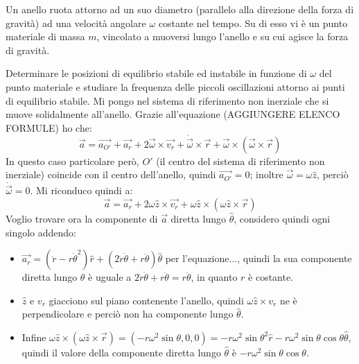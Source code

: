 \documentclass[../main.tex]{subfiles}
\begin{document}
\textex
Un anello ruota attorno ad un suo diametro (parallelo alla direzione della forza di gravità) ad una velocità
angolare $\omega$ costante nel tempo. Su di esso vi è un punto materiale di massa $m$, vincolato a muoversi lungo l'anello e su cui agisce
la forza di gravità.

Determinare le posizioni di equilibrio stabile ed instabile in funzione di $\omega$ del punto materiale e studiare la
frequenza delle piccoli oscillazioni attorno ai punti di equilibrio stabile.
\solution
Mi pongo nel sistema di riferimento non inerziale che si muove solidalmente all'anello. Grazie all'equazione 
(AGGIUNGERE ELENCO FORMULE)
ho che:
\begin{equation*}
	\overrightarrow{a}=\overrightarrow{a_{O'}}+\overrightarrow{a_r}+2\overrightarrow{\omega}\times \overrightarrow{v_r} 
	+ \dot{\overrightarrow{\omega}}\times \overrightarrow{r}+\overrightarrow{\omega}\times(\overrightarrow{\omega}
	\times\overrightarrow{r})
\end{equation*}
In questo caso particolare però, $O'$ (il centro del sistema di riferimento non inerziale) coincide con il centro
dell'anello, quindi $\overrightarrow{a_{O'}}=0$; inoltre $\overrightarrow{\omega}=\omega \hat{z}$, perciò
$\dot{\overrightarrow{\omega}}=0$. Mi riconduco quindi a:
\begin{equation*}
	\overrightarrow{a}=\overrightarrow{a_r}+2\omega\hat{z}\times \overrightarrow{v_r} 
	+\omega\hat{z}\times(\omega\hat{z}\times\overrightarrow{r})
\end{equation*}
Voglio trovare ora la componente di $\overrightarrow{a}$ diretta lungo $\hat{\theta}$, considero quindi ogni singolo
addendo:
\begin{itemize}
	\item	$\overrightarrow{a_r}=(\ddot{r}-r\dot{\theta}^2)\hat{r}+(2\dot{r}\dot{\theta}+r\ddot{\theta})\hat{\theta}$
			per l'equazione..., quindi la sua componente diretta lungo $\theta$ è uguale a $
			2\dot{r}\dot{\theta}+r\ddot{\theta}=r\ddot{\theta}$, in quanto $r$ è costante.
	\item	$\hat{z}$ e $v_r$ giacciono sul piano contenente l'anello, quindi $\omega\hat{z}\times v_r$ ne è perpendicolare
			e perciò non ha componente lungo $\hat{\theta}$.
	\item	Infine $\omega\hat{z}\times(\omega\hat{z}\times\overrightarrow{r})=
			(-r\omega^2\sin\theta,0,0)=-r\omega^2\sin\theta^2\hat{r}-r\omega^2\sin\theta\cos\theta\hat{\theta}$,
			quindi il valore della componente diretta lungo $\hat\theta$ è $-r\omega^2\sin\theta\cos\theta$.
\end{itemize}
\end{document}
